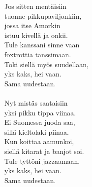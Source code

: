 
            Jos sitten mentäisiin \\
            tuonne pikkupaviljonkiin, \\
            jossa itse Amorkin \\
            istuu kivellä ja onkii. \\
            Tule kanssani sinne vaan \\
            foxtrottia tanssimaan. \\
            Toki siellä myös suudellaan, \\
            yks kaks, hei vaan. \\
            Sama uudestaan. \\
\hspace{10mm} \\
            Nyt mistäs saataisiin \\
            yksi pikku tippa viinaa. \\
            Ei Suomessa juoda saa, \\
            sillä kieltolaki piinaa. \\
            Kun koittaa aamunkoi, \\
            siellä kitarat ja banjot soi. \\
            Tule tyttöni jazzaamaan, \\
            yks kaks, hei vaan. \\
            Sama uudestaan. \\
